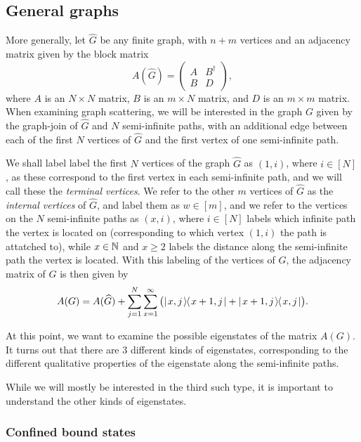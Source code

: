 \documentclass[../thesis-main/thesis-main]{subfiles}
\begin{document}
\subsection{General graphs}


More generally, let $\widehat{G}$ be any finite graph, with $n+m$ vertices and an adjacency matrix given by the block matrix
\begin{equation}
  A(\widehat{G}) = \begin{pmatrix}A & B^\dag\\ B & D\end{pmatrix},
\end{equation}
where $A$ is an $N\times N$ matrix, $B$ is an $m\times N$ matrix, and $D$ is an $m\times m$ matrix.  When examining graph scattering, we will be interested in the graph $G$ given by the graph-join of $\widehat{G}$ and $N$ semi-infinite paths, with an additional edge between each of the first $N$ vertices of $\widehat{G}$ and the first vertex of one semi-infinite path.  

We shall label label the first $N$ vertices of the graph $\widehat{G}$ as $(1,i)$, where $i\in[N]$, as these correspond to the first vertex in each semi-infinite path, and we will call these the \textit{terminal vertices}.  We refer to the other $m$ vertices of $\widehat{G}$ as the \textit{internal vertices} of $\widehat{G}$, and label them as $w\in[m]$, and we refer to the vertices on the $N$ semi-infinite paths as $(x,i)$, where $i\in[N]$ labels which infinite path the vertex is located on (corresponding to which vertex $(1,i)$ the path is attatched to), while $x\in \mathbb{N}$ and $x\geq 2$ labels the distance along the semi-infinite path the vertex is located.  With this labeling of the vertices of $G$, the adjacency matrix of $G$ is then given by
\begin{equation}
  A(G) = A(\widehat{G}) + \sum_{j=1}^N \sum_{x=1}^\infty \big(|\mspace{2mu} x,j \mspace{2mu} \rangle\mspace{-2mu}\langle\mspace{2mu} x+1,j \mspace{2mu} | + |\mspace{2mu} x+1,j \mspace{2mu} \rangle\mspace{-2mu}\langle\mspace{2mu} x,j \mspace{2mu} |\big).
\end{equation}

At this point, we want to examine the possible eigenstates of the matrix $A(G)$.  It turns out that there are 3 different kinds of eigenstates, corresponding to the different qualitative properties of the eigenstate along the semi-infinite paths.

While we will mostly be interested in the third such type, it is important to understand the other kinds of eigenstates.

\subsubsection{Confined bound states}
\end{document}
